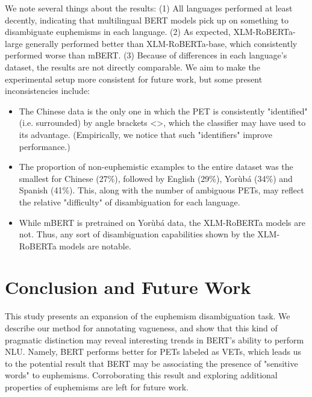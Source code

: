 \documentclass[11pt]{article}
\begin{document}
We note several things about the results: (1) All languages performed at least decently, indicating that multilingual BERT models pick up on something to disambiguate euphemisms in each language. (2) As expected,  XLM-RoBERTa-large generally performed better than  XLM-RoBERTa-base, which consistently performed worse than mBERT. (3) Because of differences in each language's dataset, the results are not directly comparable. We aim to make the experimental setup more consistent for future work, but some present inconsistencies include:
\begin{itemize}
    \item The Chinese data is the only one in which the PET is consistently "identified" (i.e. surrounded) by angle brackets <>, which the classifier may have used to its advantage. (Empirically, we notice that such "identifiers" improve performance.) 
    \item The proportion of non-euphemistic examples to the entire dataset was the smallest for Chinese (27\%), followed by English (29\%), {Yor\`{u}b\'{a}} (34\%) and Spanish (41\%). This, along with the number of ambiguous PETs, may reflect the relative "difficulty" of disambiguation for each language.
    \item While mBERT is pretrained on {Yor\`{u}b\'{a}} data, the  XLM-RoBERTa models are not. Thus, any sort of disambiguation capabilities shown by the  XLM-RoBERTa models are notable.
\end{itemize}


\section{Conclusion and Future Work}

This study presents an expansion of the euphemism disambiguation task. We describe our method for annotating vagueness, and show that this kind of pragmatic distinction may reveal interesting trends in BERT's ability to perform NLU. Namely, BERT performs better for PETs labeled as VETs, which leads us to the potential result that BERT may be associating the presence of "sensitive words" to euphemisms. Corroborating this result and exploring additional properties of euphemisms are left for future work. 
\end{document}
